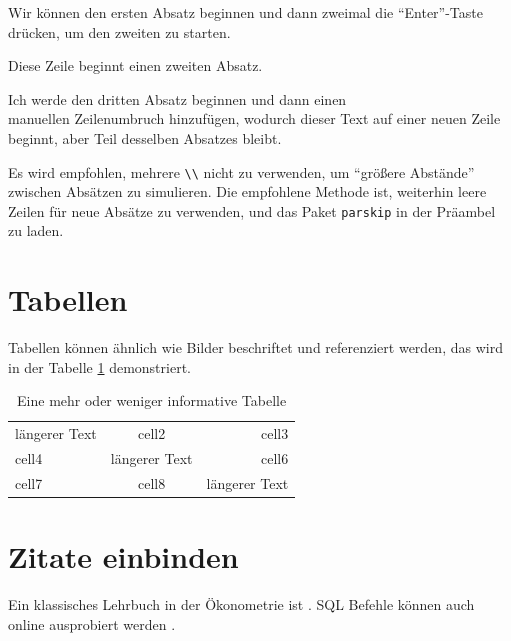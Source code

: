 \documentclass{article}
\begin{document}
Wir können den ersten Absatz beginnen und dann zweimal die ``Enter''-Taste drücken, um den zweiten zu starten.

Diese Zeile beginnt einen zweiten Absatz.

Ich werde den dritten Absatz beginnen und dann einen \\ manuellen Zeilenumbruch hinzufügen, wodurch dieser Text auf einer neuen Zeile beginnt, aber Teil desselben Absatzes bleibt.

Es wird empfohlen, mehrere \verb|\\| nicht zu verwenden, um ``größere Abstände'' zwischen Absätzen zu simulieren. Die empfohlene Methode ist, weiterhin leere Zeilen für neue Absätze zu verwenden, und das Paket \texttt{parskip} in der Präambel zu laden.

\section{Tabellen}

Tabellen können ähnlich wie Bilder beschriftet und referenziert werden, das wird in der Tabelle \ref{table:data} demonstriert.

\begin{table}[ht]
    \centering
    \begin{tabular}{|l|c|r|} 
         \hline
         längerer Text & cell2         & cell3 \\ 
         cell4         & längerer Text & cell6 \\ 
         cell7         & cell8         & längerer Text \\ 
         \hline
    \end{tabular}
    \caption{Eine mehr oder weniger informative Tabelle}
    \label{table:data}
\end{table}

\section{Zitate einbinden}

Ein klassisches Lehrbuch in der Ökonometrie ist \cite{wooldridge}. SQL Befehle können auch online ausprobiert werden \cite{sqllite}.



\end{document}
